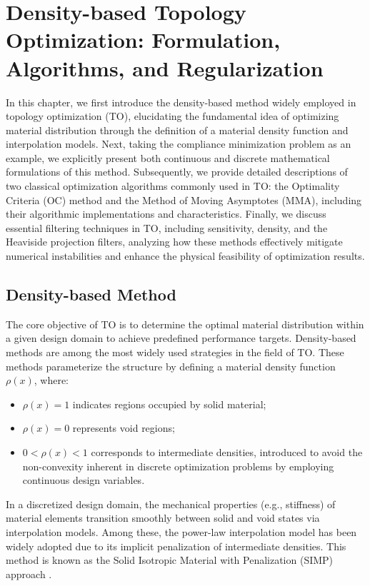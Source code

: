 \documentclass[mathpazo]{cicp}
\begin{document}
\section{Density-based Topology Optimization: Formulation, Algorithms, and Regularization}\label{sec:math}
In this chapter, we first introduce the density-based method widely employed in topology optimization (TO), elucidating the fundamental idea of optimizing material distribution through the definition of a material density function and interpolation models. Next, taking the compliance minimization problem as an example, we explicitly present both continuous and discrete mathematical formulations of this method. Subsequently, we provide detailed descriptions of two classical optimization algorithms commonly used in TO: the Optimality Criteria (OC) method and the Method of Moving Asymptotes (MMA), including their algorithmic implementations and characteristics. Finally, we discuss essential filtering techniques in TO, including sensitivity, density, and the Heaviside projection filters, analyzing how these methods effectively mitigate numerical instabilities and enhance the physical feasibility of optimization results.

\subsection{Density-based Method}
The core objective of TO is to determine the optimal material distribution within a given design domain to achieve predefined performance targets. Density-based methods are among the most widely used strategies in the field of TO. These methods parameterize the structure by defining a material density function $\rho(x)$, where:
\begin{itemize}
	\item $\rho(x) = 1$ indicates regions occupied by solid material;
	\item $\rho(x) = 0$ represents void regions;
	\item $0 < \rho(x) < 1$ corresponds to intermediate densities, introduced to avoid the non-convexity inherent in discrete optimization problems by employing continuous design variables.
\end{itemize}

In a discretized design domain, the mechanical properties (e.g., stiffness) of material elements transition smoothly between solid and void states via interpolation models\cite{bendsoe1989optimal}. Among these, the power-law interpolation model has been widely adopted due to its implicit penalization of intermediate densities. This method is known as the Solid Isotropic Material with Penalization (SIMP) approach \cite{zhou1991coc}.
\end{document}
